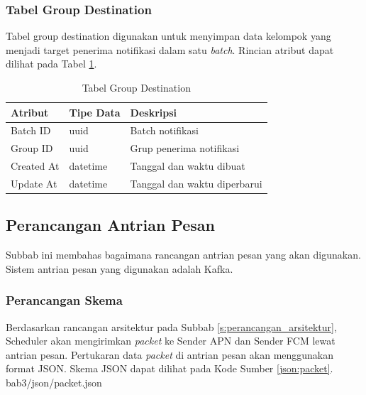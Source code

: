\subsubsection{Tabel Group Destination}
\par Tabel group destination digunakan untuk menyimpan data kelompok yang menjadi target penerima notifikasi dalam satu \textit{batch}. Rincian atribut dapat dilihat pada Tabel \ref{tabel_group_destination}.
\begin{longtable}{|p{2cm}|p{2.5cm}|p{4.5cm}|}
	\caption{Tabel Group Destination} \label{tabel_group_destination} \\ \hline
    {Atribut} & {Tipe Data} & {Deskripsi} \\ \hline
    Batch ID & uuid & Batch notifikasi \\ \hline
    Group ID & uuid & Grup penerima notifikasi \\ \hline
    Created At & datetime & Tanggal dan waktu dibuat \\ \hline
    Update At & datetime & Tanggal dan waktu diperbarui \\ \hline
\end{longtable}

\subsection{Perancangan Antrian Pesan}
\par Subbab ini membahas bagaimana rancangan antrian pesan yang akan digunakan. Sistem antrian pesan yang digunakan adalah Kafka.

\subsubsection{Perancangan Skema}
\par Berdasarkan rancangan arsitektur pada Subbab \ref{s:perancangan_arsitektur}, Scheduler akan mengirimkan \textit{packet} ke Sender APN dan Sender FCM lewat antrian pesan. Pertukaran data \textit{packet} di antrian pesan akan menggunakan format JSON. Skema JSON dapat dilihat pada Kode Sumber \ref{json:packet}.
 {bab3/json/packet.json}

